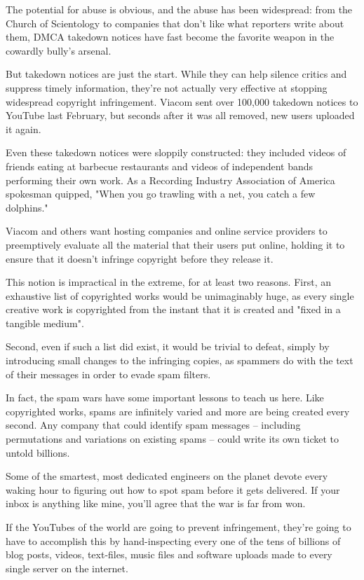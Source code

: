 The potential for abuse is obvious, and the abuse has been
widespread: from the Church of Scientology to companies that don't
like what reporters write about them, DMCA takedown notices have
fast become the favorite weapon in the cowardly bully's arsenal.

But takedown notices are just the start. While they can help
silence critics and suppress timely information, they're not
actually very effective at stopping widespread copyright
infringement. Viacom sent over 100,000 takedown notices to YouTube
last February, but seconds after it was all removed, new users
uploaded it again.

Even these takedown notices were sloppily constructed: they
included videos of friends eating at barbecue restaurants and
videos of independent bands performing their own work. As a
Recording Industry Association of America spokesman quipped, "When
you go trawling with a net, you catch a few dolphins."

Viacom and others want hosting companies and online service
providers to preemptively evaluate all the material that their
users put online, holding it to ensure that it doesn't infringe
copyright before they release it.

This notion is impractical in the extreme, for at least two
reasons. First, an exhaustive list of copyrighted works would be
unimaginably huge, as every single creative work is copyrighted
from the instant that it is created and "fixed in a tangible
medium".

Second, even if such a list did exist, it would be trivial to
defeat, simply by introducing small changes to the infringing
copies, as spammers do with the text of their messages in order to
evade spam filters.

In fact, the spam wars have some important lessons to teach us
here. Like copyrighted works, spams are infinitely varied and more
are being created every second. Any company that could identify
spam messages -- including permutations and variations on existing
spams -- could write its own ticket to untold billions.

Some of the smartest, most dedicated engineers on the planet devote
every waking hour to figuring out how to spot spam before it gets
delivered. If your inbox is anything like mine, you'll agree that
the war is far from won.

If the YouTubes of the world are going to prevent infringement,
they're going to have to accomplish this by hand-inspecting every
one of the tens of billions of blog posts, videos, text-files,
music files and software uploads made to every single server on the
internet.


